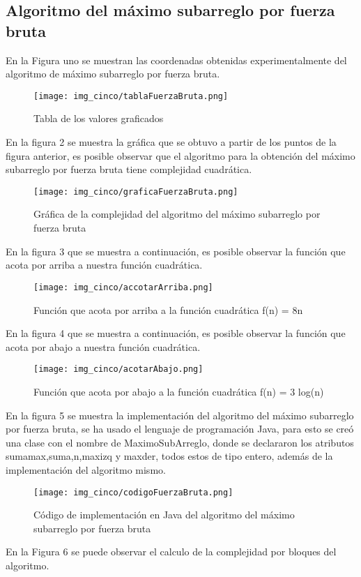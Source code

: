 \documentclass[12pt,twoside]{article}
\begin{document}
\subsection*{Algoritmo del máximo subarreglo por fuerza bruta}
En la Figura uno se muestran las coordenadas obtenidas experimentalmente del algoritmo de máximo subarreglo por fuerza bruta.
\vspace{10 mm}
\begin{figure}[H]
\centering
\texttt{[image: img\_cinco/tablaFuerzaBruta.png]}
\caption{Tabla de los valores graficados}
\end{figure}
En la figura 2 se muestra la gráfica que se obtuvo a partir de los puntos de la figura anterior, es posible observar que el algoritmo para la obtención del máximo subarreglo por fuerza bruta tiene complejidad cuadrática.
\vspace{10 mm}
\begin{figure}[H]
\centering
\texttt{[image: img\_cinco/graficaFuerzaBruta.png]}
\caption{Gráfica de la complejidad del algoritmo del máximo subarreglo por fuerza bruta}
\end{figure}
En la figura 3 que se muestra a continuación, es posible observar la función que acota por arriba a nuestra función cuadrática.
\vspace{20 mm}
\begin{figure}[H]
\centering
\texttt{[image: img\_cinco/accotarArriba.png]}
\caption{Función que acota por arriba a la función cuadrática f(n) = 8n}
\end{figure}
\vspace{20 mm}
En la figura 4 que se muestra a continuación, es posible observar la función que acota por abajo a nuestra función cuadrática.
\vspace{10 mm}
\begin{figure}[H]
\centering
\texttt{[image: img\_cinco/acotarAbajo.png]}
\caption{Función que acota por abajo a la función cuadrática f(n) = 3 log(n)}
\end{figure}

En la figura 5 se muestra la implementación del algoritmo del máximo subarreglo por fuerza bruta, se ha usado el lenguaje de programación Java, para esto se creó una clase con el nombre de MaximoSubArreglo, donde se declararon los atributos sumamax,suma,n,maxizq y maxder, todos estos de tipo entero, además de la implementación del algoritmo mismo.
\vspace{10 mm}
\begin{figure}[H]
\centering
\texttt{[image: img\_cinco/codigoFuerzaBruta.png]}
\caption{Código de implementación en Java del algoritmo del máximo subarreglo por fuerza bruta}
\end{figure}
\vspace{10 mm}
En la Figura 6 se puede observar el calculo de la complejidad por bloques del algoritmo.
\vspace{10 mm}
\end{document}
